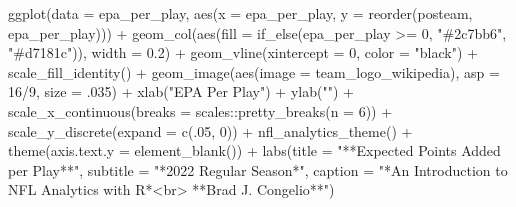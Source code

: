 \documentclass[
  letterpaper,
]{krantz}
\newenvironment{Shaded}{\begin{snugshade}}{\end{snugshade}}
\newcommand{\AttributeTok}[1]{\textcolor[rgb]{0.40,0.45,0.13}{#1}}
\newcommand{\DecValTok}[1]{\textcolor[rgb]{0.68,0.00,0.00}{#1}}
\newcommand{\FloatTok}[1]{\textcolor[rgb]{0.68,0.00,0.00}{#1}}
\newcommand{\FunctionTok}[1]{\textcolor[rgb]{0.28,0.35,0.67}{#1}}
\newcommand{\NormalTok}[1]{\textcolor[rgb]{0.00,0.23,0.31}{#1}}
\newcommand{\SpecialCharTok}[1]{\textcolor[rgb]{0.37,0.37,0.37}{#1}}
\newcommand{\StringTok}[1]{\textcolor[rgb]{0.13,0.47,0.30}{#1}}
\begin{document}
\begin{Shaded}
\begin{Highlighting}[]
\FunctionTok{ggplot}\NormalTok{(}\AttributeTok{data =}\NormalTok{ epa\_per\_play, }\FunctionTok{aes}\NormalTok{(}\AttributeTok{x =}\NormalTok{ epa\_per\_play,}
                                \AttributeTok{y =} \FunctionTok{reorder}\NormalTok{(posteam, epa\_per\_play))) }\SpecialCharTok{+}
  \FunctionTok{geom\_col}\NormalTok{(}\FunctionTok{aes}\NormalTok{(}\AttributeTok{fill =} \FunctionTok{if\_else}\NormalTok{(epa\_per\_play }\SpecialCharTok{\textgreater{}=} \DecValTok{0}\NormalTok{,}
                              \StringTok{"\#2c7bb6"}\NormalTok{, }\StringTok{"\#d7181c"}\NormalTok{)),}
           \AttributeTok{width =} \FloatTok{0.2}\NormalTok{) }\SpecialCharTok{+}
  \FunctionTok{geom\_vline}\NormalTok{(}\AttributeTok{xintercept =} \DecValTok{0}\NormalTok{, }\AttributeTok{color =} \StringTok{"black"}\NormalTok{) }\SpecialCharTok{+}
  \FunctionTok{scale\_fill\_identity}\NormalTok{() }\SpecialCharTok{+}
  \FunctionTok{geom\_image}\NormalTok{(}\FunctionTok{aes}\NormalTok{(}\AttributeTok{image =}\NormalTok{ team\_logo\_wikipedia),}
             \AttributeTok{asp =} \DecValTok{16}\SpecialCharTok{/}\DecValTok{9}\NormalTok{, }\AttributeTok{size =}\NormalTok{ .}\DecValTok{035}\NormalTok{) }\SpecialCharTok{+}
  \FunctionTok{xlab}\NormalTok{(}\StringTok{"EPA Per Play"}\NormalTok{) }\SpecialCharTok{+}
  \FunctionTok{ylab}\NormalTok{(}\StringTok{""}\NormalTok{) }\SpecialCharTok{+}
  \FunctionTok{scale\_x\_continuous}\NormalTok{(}\AttributeTok{breaks =}\NormalTok{ scales}\SpecialCharTok{::}\FunctionTok{pretty\_breaks}\NormalTok{(}\AttributeTok{n =} \DecValTok{6}\NormalTok{)) }\SpecialCharTok{+}
  \FunctionTok{scale\_y\_discrete}\NormalTok{(}\AttributeTok{expand =} \FunctionTok{c}\NormalTok{(.}\DecValTok{05}\NormalTok{, }\DecValTok{0}\NormalTok{)) }\SpecialCharTok{+}
  \FunctionTok{nfl\_analytics\_theme}\NormalTok{() }\SpecialCharTok{+}
  \FunctionTok{theme}\NormalTok{(}\AttributeTok{axis.text.y =} \FunctionTok{element\_blank}\NormalTok{()) }\SpecialCharTok{+}
  \FunctionTok{labs}\NormalTok{(}\AttributeTok{title =} \StringTok{"**Expected Points Added per Play**"}\NormalTok{,}
       \AttributeTok{subtitle =} \StringTok{"*2022 Regular Season*"}\NormalTok{,}
       \AttributeTok{caption =} \StringTok{"*An Introduction to NFL Analytics with R*\textless{}br\textgreater{}}
\StringTok{       **Brad J. Congelio**"}\NormalTok{)}
\end{Highlighting}
\end{Shaded}
\end{document}
